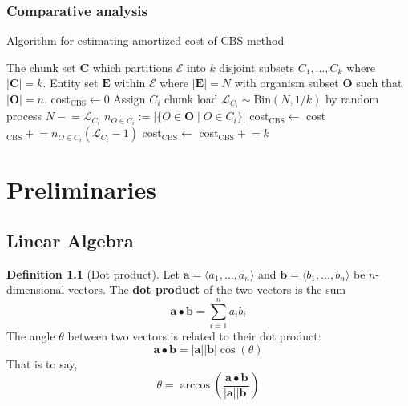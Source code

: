\documentclass[a4paper, 12pt]{report}
\theoremstyle{definition}
\newtheorem{definition}{Definition}[chapter]
\begin{document}
\subsection{Comparative analysis}
\begin{algorithm}[ht!]
    \caption{Algorithm for estimating amortized cost of CBS method}
    \begin{algorithmic}[1]
        \Require The chunk set $\mathbf C$ which partitions $\mathscr E$ into $k$ disjoint
        subsets $C_1, \ldots, C_k$ where $|\mathbf C| = k$. Entity set $\mathbf E$ within $\mathscr E$
        where $|\mathbf E| = N$ with organism subset $\mathbf O$ such that $|\mathbf O| = n$.
        \State cost$_{\text{CBS}} \leftarrow 0$ 
            \State Assign $C_i$ chunk load $\mathcal L_{C_i} \sim \text{Bin}(N, 1/k)$ by random process
            \State $N \mathrel{-}= \mathcal L_{C_i}$ 
            \State $n_{O \in C_i} := |\{O \in \mathbf O \mid O \in C_i\}|$ 
            \State cost$_{\text{CBS}} \leftarrow$ cost$_{\text{CBS}} \mathrel{+}= n_{O \in C_i} (\mathcal L_{C_i} - 1)$
        \EndFor
        \State cost$_{\text{CBS}} \leftarrow$ cost$_{\text{CBS}} \mathrel{+}= k$
        \EndProcedure
    \end{algorithmic}
    \label{cbs-costmodel}
\end{algorithm}

\appendix

\newpage

\chapter{Preliminaries}
\section{Linear Algebra}
\begin{definition}[Dot product]
    Let $\mathbf a = \langle a_1, \ldots, a_n \rangle$ and $\mathbf b = \langle b_1, \ldots, b_n \rangle$ be $n$-dimensional vectors. The \textbf{dot product} of the two vectors is the sum
    \[
        \mathbf a \bullet \mathbf b = \sum_{i = 1}^n a_i b_i
    \]
    The angle $\theta$ between two vectors is related to their dot product:
    \[
        \mathbf a \bullet \mathbf b = |\mathbf a||\mathbf b|\cos(\theta)
    \]
    That is to say,
    \[
        \theta = \arccos\left(\frac{\mathbf a \bullet \mathbf b}{|\mathbf a||\mathbf b|}\right)
    \]
\end{definition}
\end{document}
